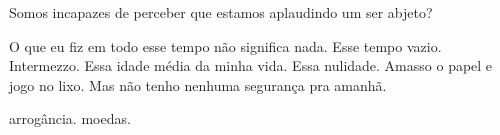 \begin{poem}
\begin{stanza}
\qquad *
\end{stanza}
\begin{stanza}
Somos incapazes de perceber\verseline
que estamos aplaudindo\verseline
um ser abjeto?
\end{stanza}
\begin{stanza}
O que eu fiz em todo esse tempo não significa nada. Esse
tempo vazio. Intermezzo. Essa idade média da minha vida.
Essa nulidade. Amasso o papel e jogo no lixo. Mas não tenho
nenhuma segurança pra amanhã.
\end{stanza}
\begin{stanza}
\qquad *
\end{stanza}
\begin{stanza}
\qquad arrogância.\verseline
\qquad moedas.
\end{stanza}
\end{poem}